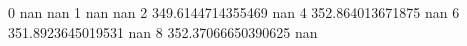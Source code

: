 0 nan nan
1 nan nan
2 349.6144714355469 nan
4 352.864013671875 nan
6 351.8923645019531 nan
8 352.37066650390625 nan
